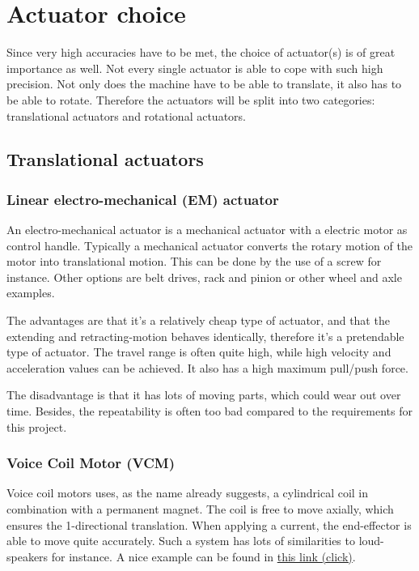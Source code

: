 \section{Actuator choice}
Since very high accuracies have to be met, the choice of actuator(s) is of great importance as well. Not every single actuator is able to cope with such high precision. Not only does the machine have to be able to translate, it also has to be able to rotate. Therefore the actuators will be split into two categories: translational actuators and rotational actuators.
\subsection{Translational actuators}
\subsubsection*{Linear electro-mechanical (EM) actuator}
An electro-mechanical actuator is a mechanical actuator with a electric motor as control handle. Typically a mechanical actuator converts the rotary motion of the motor into translational motion. This can be done by the use of a screw for instance. Other options are belt drives, rack and pinion or other wheel and axle examples.

The advantages are that it's a relatively cheap type of actuator, and that the extending and retracting-motion behaves identically, therefore it's a pretendable type of actuator. The travel range is often quite high, while high velocity and acceleration values can be achieved. It also has a high maximum pull/push force.

The disadvantage is that it has lots of moving parts, which could wear out over time. Besides, the repeatability is often too bad compared to the requirements for this project.

\subsubsection*{Voice Coil Motor (VCM)}
Voice coil motors uses, as the name already suggests, a cylindrical coil in combination with a permanent magnet. The coil is free to move axially, which ensures the 1-directional translation. When applying a current, the end-effector is able to move quite accurately. Such a system has lots of similarities to loud-speakers for instance. A nice example can be found in \href{https://www.youtube.com/watch?v=BQJg7I-4620}{this link (click)}. 

